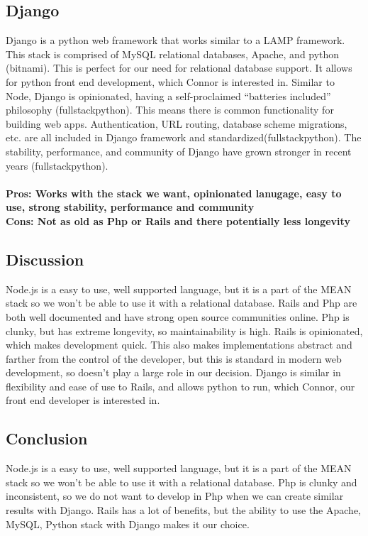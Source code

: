 \documentclass[draftclsnofoot,onecolumn,letterpaper,10pt,compsoc]{IEEEtran}
\begin{document}
\subsection{Django}
		Django is a python web framework that works similar to a LAMP framework.
		This stack is comprised of MySQL relational databases, Apache, and python (bitnami).
		This is perfect for our need for relational database support. It allows for python front end development, which Connor is interested in.
		Similar to Node, Django is opinionated, having a self-proclaimed “batteries included” philosophy (fullstackpython).
		This means there is common functionality for building web apps. Authentication, URL routing, database scheme migrations, etc. are all included in Django framework and standardized(fullstackpython).
		The stability, performance, and community of Django have grown stronger in recent years (fullstackpython).
		\\ \\
		\textbf{Pros: Works with the stack we want, opinionated lanugage, easy to use, strong stability, performance and community }
		\\
		\textbf{Cons: Not as old as Php or Rails and there potentially less longevity}

		\subsection{Discussion}
		Node.js is a easy to use, well supported language, but it is a part of the MEAN stack so we won’t be able to use it with a relational database.
		Rails and Php are both well documented and have strong open source communities online.
		Php is clunky, but has extreme longevity, so maintainability is high.
		Rails is opinionated, which makes development quick.
		This also makes implementations abstract and farther from the control of the developer, but this is standard in modern web development, so doesn't play a large role in our decision.
		Django is similar in flexibility and ease of use to Rails, and allows python to run, which Connor, our front end developer is interested in.

		\subsection{Conclusion}
		Node.js is a easy to use, well supported language, but it is a part of the MEAN stack so we won’t be able to use it with a relational database.
		Php is clunky and inconsistent, so we do not want to develop in Php when we can create similar results with Django.
		Rails has a lot of benefits, but the ability to use the Apache, MySQL, Python stack with Django makes it our choice.

\clearpage

{}

\end{document}
